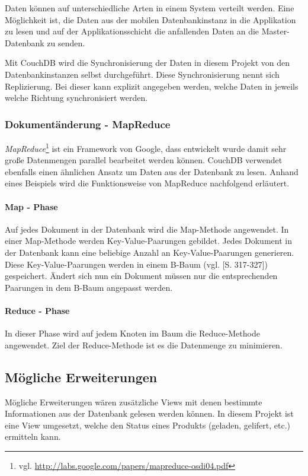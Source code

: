 Daten können auf unterschiedliche Arten in einem System verteilt werden. Eine
	Möglichkeit ist, die Daten aus der mobilen Datenbankinstanz in die Applikation
	zu lesen und auf der Applikationsschicht die anfallenden Daten an die
	Master-Datenbank zu senden.

Mit CouchDB wird die Synchronisierung der Daten in diesem Projekt von den
	Datenbankinstanzen selbst durchgeführt. Diese Synchronisierung nennt sich 
	Replizierung. Bei dieser kann explizit angegeben werden, welche Daten
	in jeweils welche Richtung synchronisiert werden.

\subsubsection{Dokumentänderung - MapReduce}

\emph{MapReduce}\footnote{vgl. \url{http://labs.google.com/papers/mapreduce-osdi04.pdf}}
	ist ein Framework von Google, dass entwickelt wurde damit sehr große
	Datenmengen parallel bearbeitet werden können. CouchDB verwendet ebenfalls
	einen ähnlichen Ansatz um Daten aus der Datenbank zu lesen. Anhand eines
	Beispiels wird die Funktionsweise von MapReduce nachfolgend erläutert.

\paragraph{Map - Phase} Auf jedes Dokument in der Datenbank wird die Map-Methode
	angewendet. In einer Map-Methode werden Key-Value-Paarungen gebildet. Jedes
	Dokument in der Datenbank kann eine beliebige Anzahl an Key-Value-Paarungen
	generieren. Diese Key-Value-Paarungen werden in einem B-Baum (vgl.
	\cite{Ottmann96}[S. 317-327]) gespeichert. Ändert sich nun ein Dokument müssen
	nur die entsprechenden Paarungen in	dem B-Baum angepasst werden. 

\paragraph{Reduce - Phase} In dieser Phase wird auf jedem Knoten im Baum die
	Reduce-Methode angewendet. Ziel der Reduce-Methode ist es die Datenmenge zu
	minimieren.

\subsection{Mögliche Erweiterungen}

Mögliche Erweiterungen wären zusätzliche Views mit denen bestimmte Informationen
	aus der Datenbank gelesen werden können. In diesem Projekt ist eine View
	umgesetzt, welche den Status eines Produkts (geladen, gelifert, etc.) ermitteln
	kann.

